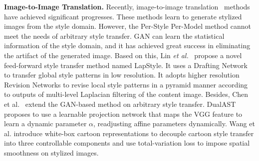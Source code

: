 \documentclass[times,twocolumn,final,authoryear]{elsarticle}
\begin{document}
\textbf{Image-to-Image Translation.} Recently, image-to-image translation~\citep{zhu2017unpaired,lin2020tuigan,chen2021dualast,xu2021drb,zhang2021generating,zhang2024artbank,zhang2024towards,li2024rethinking,zuo2023generative} methods have achieved significant progresses. These methods learn to generate stylized images from the style domain. However, the Per-Style Per-Model method cannot meet the needs of arbitrary style transfer. GAN can learn the statistical information of the style domain, and it has achieved great success in eliminating the artifact of the generated image. Based on this, Lin \emph{et al.}~\citep{lin2021drafting} propose a novel feed-forward style transfer method
named LapStyle. It uses a Drafting Network to transfer global style patterns in low resolution. It adopts
higher resolution Revision Networks to revise local style patterns in a pyramid manner according to outputs of multi-level Laplacian filtering of the content image. Besides, Chen et al.~\citep{chen2021artistic} extend the GAN-based method on arbitrary style transfer. 
DualAST~\citep{chen2021dualast} proposes to use a learnable projection network that maps the VGG feature to learn a dynamic parameter $\alpha$, readjusting affine parameters dynamically. Wang et al. \citep{wang2020learning} introduce white-box cartoon representations to decouple cartoon style transfer into three controllable components and use total-variation loss \citep{aly2005image,sun2023vgos,sun20243dgstream} to impose spatial smoothness on stylized images.
\end{document}
